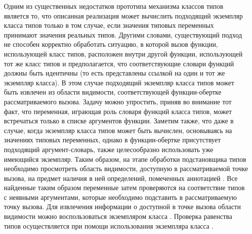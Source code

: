 Одним из существенных недостатков прототипа механизма классов типов является то, что описанная реализация может вычислить подходящий экземпляр класса типов только в том случае, если значения типовых переменных принимают значения реальных типов. Другими словами, существующий подход не способен корректно обработать ситуацию, в которой вызов функции, использующей класс типов, расположен внутри другой функции, использующей тот же класс типов и предполагается, что соответствующие словари функций должны быть идентичны (то есть представлены ссылкой на один и тот же экземпляр класса). В этом случае подходящий экземпляр класса типов может быть извлечен из области видимости, соответствующей функции-обертке рассматриваемого вызова. Задачу можно упростить, приняв во внимание тот факт, что переменная, играющая роль словаря функций класса типов, может встречаться только в списке аргументов функции. Заметим также, что даже в случае, когда экземпляр класса типов может быть вычислен, основываясь на значениях типовых переменных, однако в функции-обертке присутствует подходящий аргумент-словарь, также целесообразно использовать уже имеющийся экземпляр. Таким образом, на этапе обработки подстановщика типов необходимо просмотреть область видимости, доступную в рассматриваемой точке вызова, на предмет наличия в ней определений, помеченных аннотацией . Все найденные таким образом переменные затем проверяются на соответствие типов с неявными аргументами, которые необходимо подставить в рассматриваемую точку вызова.
Для извлечения информации о доступной в точке вызова области видимости можно воспользоваться экземпляром класса . Проверка равенства типов осуществляется при помощи использования экземпляра класса .

